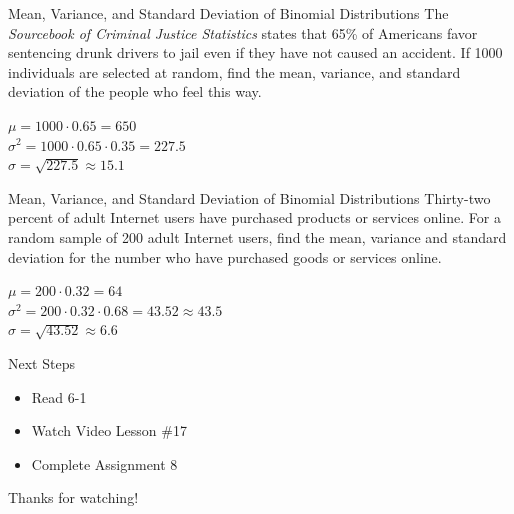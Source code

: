 \documentclass[t, aspectratio=169]{beamer}
\newcommand{\?}{\stackrel{?}{=}}
\begin{document}
	\begin{frame}{Mean, Variance, and Standard Deviation of Binomial Distributions}
		The \textit{Sourcebook of Criminal Justice Statistics} states that 65\% of Americans favor sentencing drunk drivers to jail even if they have not caused an accident. If 1000 individuals are selected at random, find the mean, variance, and standard deviation of the people who feel this way. \pause
		
		$\mu = 1000 \cdot 0.65 = 650$ \\ \pause
		$\sigma^2 = 1000 \cdot 0.65 \cdot 0.35 = 227.5$ \\ \pause
		$\sigma = \sqrt{227.5} \approx 15.1$
	\end{frame}

	\begin{frame}{Mean, Variance, and Standard Deviation of Binomial Distributions}
		Thirty-two percent of adult Internet users have purchased products or services online. For a random sample of 200 adult Internet users, find the mean, variance and standard deviation for the number who have purchased goods or services online.
		
		$\mu = 200 \cdot 0.32 = 64$ \\ \pause
		$\sigma^2 = 200 \cdot 0.32 \cdot 0.68 = 43.52 \approx 43.5$ \\ \pause
		$\sigma = \sqrt{43.52} \approx 6.6$
	\end{frame}

	\begin{frame}{Next Steps}
		\begin{itemize}
			\item Read 6-1
			\item Watch Video Lesson \#17
			\item Complete Assignment 8
		\end{itemize}
	
		\vfill
		
		Thanks for watching!
	\end{frame}
	
\end{document}
